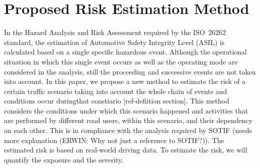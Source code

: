 \section{Proposed Risk Estimation Method} %
\label{sec:method}
%	
%	 
%
 
In the Hazard Analysis and Risk Assessment required by the ISO~26262 standard, the estimation of Automotive Safety Integrity Level (ASIL) is calculated based on a single specific hazardous event.
Although the operational situation in which this single event occurs as well as the operating mode are considered in the analysis, still the proceeding and successive events are not taken into account.
In this paper, we propose a new method to estimate the risk of a certain traffic scenario taking into account the whole chain of events and conditions occur duringthat constiario [ref-defiition section].
 This method considers the conditions under which this scenario happened and activities that are performed by different road users, within this scenario, and their dependency on each other. This is in compliance with the analysis required by SOTIF (needs more explanation (ERWIN: Why not just a reference to SOTIF?)).  The estimated risk is based on real-world driving data. To estimate the risk, we will quantify the exposure and the severity.

